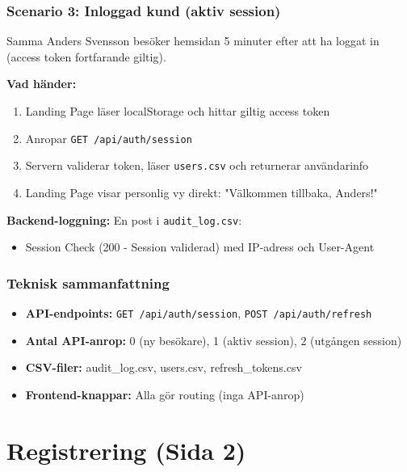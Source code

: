 \documentclass[12pt,a4paper]{article}
\begin{document}
\subsubsection{Scenario 3: Inloggad kund (aktiv session)}
Samma Anders Svensson besöker hemsidan 5 minuter efter att ha loggat in (access token fortfarande giltig).

\textbf{Vad händer:}
\begin{enumerate}[noitemsep]
  \item Landing Page läser localStorage och hittar giltig access token
  \item Anropar \texttt{GET /api/auth/session} 
  \item Servern validerar token, läser \texttt{users.csv} och returnerar användarinfo
  \item Landing Page visar personlig vy direkt: "Välkommen tillbaka, Anders!"
\end{enumerate}

\textbf{Backend-loggning:} En post i \texttt{audit\_log.csv}:
\begin{itemize}[noitemsep]
  \item Session Check (200 - Session validerad) med IP-adress och User-Agent
\end{itemize}

\subsubsection{Teknisk sammanfattning}
\begin{itemize}[noitemsep]
  \item \textbf{API-endpoints:} \texttt{GET /api/auth/session}, \texttt{POST /api/auth/refresh}
  \item \textbf{Antal API-anrop:} 0 (ny besökare), 1 (aktiv session), 2 (utgången session)
  \item \textbf{CSV-filer:} audit\_log.csv, users.csv, refresh\_tokens.csv
  \item \textbf{Frontend-knappar:} Alla gör routing (inga API-anrop)
\end{itemize}

\newpage





\section{Registrering (Sida 2)}
\end{document}
